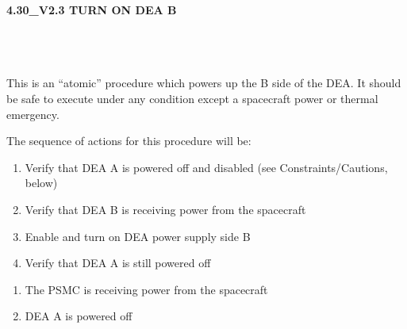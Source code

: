 \documentclass[11pt]{article}
\begin{document}
%
%
%
\newcommand{\be}{\begin{enumerate}}
\newcommand{\ee}{\end{enumerate}}
\newcommand{\bc}{\begin{center}}
\newcommand{\ec}{\end{center}}
\newcommand{\bi}{\begin{itemize}}
\newcommand{\ei}{\end{itemize}}
\newcommand{\bd}{\begin{description}}
\newcommand{\ed}{\end{description}}
\newcommand{\bt}{\begin{tabbing}}
\newcommand{\et}{\end{tabbing}}
\newcommand{\eg}{{\it e.g.~}}
\newcommand{\ie}{{\it i.e.~}}
\newcommand{\ul}{\underline}
\newcommand{\axaf}{{\em AXAF}}

\def\la{\hbox{\rlap{$<$}\lower0.5ex\hbox{$\sim$}\ }}


\large
\centerline {\bf 4.30\_V2.3 TURN ON DEA B  }
\vspace{0.25in}

\normalsize
{}\\
 \\


 \\
\normalsize
This is an ``atomic'' procedure which  powers up the B side of the DEA.
It should be safe to execute under any condition except a spacecraft
power or thermal emergency.

\noindent The sequence of actions for this procedure will be:
\be
\item Verify that DEA A is powered off and disabled (see Constraints/Cautions, below)
\vspace{-0.10in}
\item Verify that DEA B is receiving power from the spacecraft
\vspace{-0.10in}
\item Enable and turn on DEA power supply side B
\vspace{-0.10in}
\item Verify that DEA A is still powered off
\ee

\vspace{0.15in}
\normalsize
{}
\normalsize
\be
\item The PSMC is receiving power from the spacecraft
\vspace{-0.10in}
\item DEA A is powered off
\ee
\end{document}
